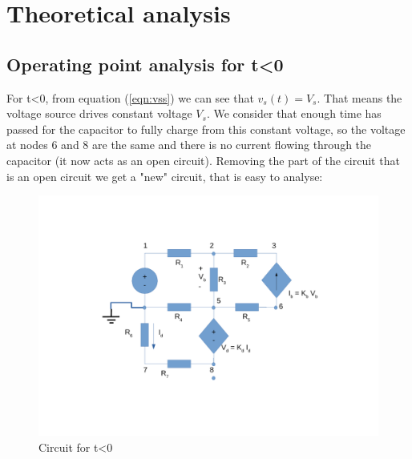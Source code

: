 \section{Theoretical analysis}
\label{sec:ta}
\subsection{Operating point analysis for t\textless0}
\label{ssec:tl}
For t\textless0, from equation (\eqref{eqn:vss}) we can see that $v_s (t)= V_s$. That means the voltage source drives constant voltage $V_s$. We consider that enough time has passed for the capacitor to fully charge from this constant voltage, so the voltage at nodes 6 and 8 are the same and there is no current flowing through the capacitor (it now acts as an open circuit). Removing the part of the circuit that is an open circuit we get a "new" circuit, that is easy to analyse: \\
\begin{figure}[H] \centering
\includegraphics[width=0.8\linewidth]{tmenor0.pdf}
\caption{Circuit for t\textless0}
\label{fig:zim}
\end{figure}

